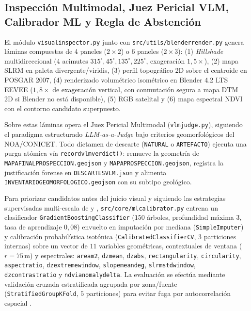 \documentclass[11pt,a4paper]{article}
\DeclareRobustCommand{\_}{\ifmmode\mbox{\textunderscore}\else\textunderscore\allowbreak\fi}
\begin{document}
\subsection{Inspecci\'on Multimodal, Juez Pericial VLM, Calibrador ML y Regla de Abstenci\'on}

El m\'odulo \texttt{visual\_inspector.py} junto con \texttt{src/utils/blender\_render.py} genera l\'aminas compuestas de 4 paneles ($2\times 2$) o 6 paneles ($2\times 3$): (1) \emph{Hillshade} multidireccional ($4$ acimutes $315^\circ, 45^\circ, 135^\circ, 225^\circ$, exageraci\'on $1{,}5\times$), (2) mapa SLRM en paleta divergente/viridis, (3) perfil topogr\'afico 2D sobre el centroide en POSGAR 2007, (4) renderizado volum\'etrico isom\'etrico en Blender 4.2 LTS EEVEE ($1{,}8\times$ de exageraci\'on vertical, con conmutaci\'on segura a mapa DTM 2D si Blender no est\'a disponible), (5) RGB satelital y (6) mapa espectral NDVI con el contorno candidato superpuesto.

Sobre estas l\'aminas opera el Juez Pericial Multimodal (\texttt{vlm\_judge.py}), siguiendo el paradigma estructurado \emph{LLM-as-a-Judge} \citep{Zheng2023} bajo criterios geomorfol\'ogicos del NOA/CONICET. Todo dictamen de descarte (\texttt{NATURAL} o \texttt{ARTEFACTO}) ejecuta una purga at\'omica v\'ia \texttt{record\_vlm\_verdict()}: remueve la geometr\'ia de \texttt{MAPA\_FINAL\_PROSPECCION.geojson} y \texttt{MAPA\_PROSPECCION\_*.geojson}, registra la justificaci\'on forense en \texttt{DESCARTES\_VLM.json} y alimenta \texttt{INVENTARIO\_GEOMORFOLOGICO.geojson} con su subtipo geol\'ogico.

Para priorizar candidatos antes del juicio visual y siguiendo las estrategias supervisadas multi-escala de \citet{Guyot2018} y \citet{BerganzoBesga2021}, \texttt{src/core/ml\_calibrator.py} entrena un clasificador \texttt{GradientBoostingClassifier} ($150$ \'arboles, profundidad m\'axima $3$, tasa de aprendizaje $0{,}08$) envuelto en imputaci\'on por mediana (\texttt{SimpleImputer}) y calibraci\'on probabil\'istica isot\'onica (\texttt{CalibratedClassifierCV}, $3$ particiones internas) sobre un vector de $11$ variables geom\'etricas, contextuales de ventana ($r=75\,\mathrm{m}$) y espectrales: \texttt{area\_m2}, \texttt{dz\_mean}, \texttt{dz\_abs}, \texttt{rectangularity}, \texttt{circularity}, \texttt{aspect\_ratio}, \texttt{dz\_extreme\_window}, \texttt{slope\_mean\_deg}, \texttt{slrm\_std\_window}, \texttt{dz\_contrast\_ratio} y \texttt{ndvi\_anomaly\_delta}. La evaluaci\'on se efect\'ua mediante validaci\'on cruzada estratificada agrupada por zona/fuente (\texttt{StratifiedGroupKFold}, $5$ particiones) para evitar fuga por autocorrelaci\'on espacial \citep{Roberts2017}.
\end{document}
